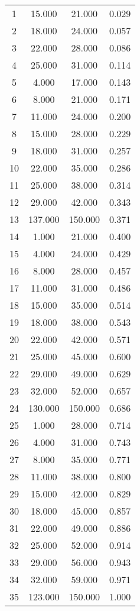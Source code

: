 % 
\begin{tabular}{cccc}
  \hline
  \hline
1 & 15.000 & 21.000 & 0.029 \\ 
  2 & 18.000 & 24.000 & 0.057 \\ 
  3 & 22.000 & 28.000 & 0.086 \\ 
  4 & 25.000 & 31.000 & 0.114 \\ 
  5 & 4.000 & 17.000 & 0.143 \\ 
  6 & 8.000 & 21.000 & 0.171 \\ 
  7 & 11.000 & 24.000 & 0.200 \\ 
  8 & 15.000 & 28.000 & 0.229 \\ 
  9 & 18.000 & 31.000 & 0.257 \\ 
  10 & 22.000 & 35.000 & 0.286 \\ 
  11 & 25.000 & 38.000 & 0.314 \\ 
  12 & 29.000 & 42.000 & 0.343 \\ 
  13 & 137.000 & 150.000 & 0.371 \\ 
  14 & 1.000 & 21.000 & 0.400 \\ 
  15 & 4.000 & 24.000 & 0.429 \\ 
  16 & 8.000 & 28.000 & 0.457 \\ 
  17 & 11.000 & 31.000 & 0.486 \\ 
  18 & 15.000 & 35.000 & 0.514 \\ 
  19 & 18.000 & 38.000 & 0.543 \\ 
  20 & 22.000 & 42.000 & 0.571 \\ 
  21 & 25.000 & 45.000 & 0.600 \\ 
  22 & 29.000 & 49.000 & 0.629 \\ 
  23 & 32.000 & 52.000 & 0.657 \\ 
  24 & 130.000 & 150.000 & 0.686 \\ 
  25 & 1.000 & 28.000 & 0.714 \\ 
  26 & 4.000 & 31.000 & 0.743 \\ 
  27 & 8.000 & 35.000 & 0.771 \\ 
  28 & 11.000 & 38.000 & 0.800 \\ 
  29 & 15.000 & 42.000 & 0.829 \\ 
  30 & 18.000 & 45.000 & 0.857 \\ 
  31 & 22.000 & 49.000 & 0.886 \\ 
  32 & 25.000 & 52.000 & 0.914 \\ 
  33 & 29.000 & 56.000 & 0.943 \\ 
  34 & 32.000 & 59.000 & 0.971 \\ 
  35 & 123.000 & 150.000 & 1.000 \\ 
   \hline
\end{tabular}
